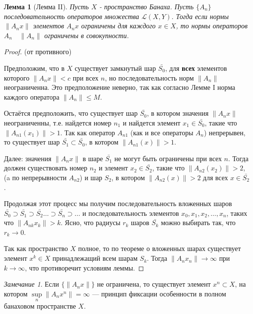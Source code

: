 \documentclass[12pt,a4paper,titlepage]{book}
\theoremstyle{definition}
\theoremstyle{plain}
\theoremstyle{remark}
\newtheorem*{remark}{Замечание}
\theoremstyle{plain}
\newtheorem{lemma}{Лемма}
\begin{document}
\begin{lemma}[Лемма II]
Пусть $X$ - пространство Банаха. Пусть $\lbrace A_n\rbrace$ последовательность операторов множества $\mathcal{L}(X,Y)$. Тогда если нормы $\lVert A_n x\rVert$ элементов $A_n x$ ограничены для каждого $x \in X$, то нормы операторов $A_n \quad \lVert A_n\rVert$ ограничены в совокупности.
\end{lemma}

\begin{proof}
(от противного)

Предположим, что в $X$ существует замкнутый шар $\bar{S_0}$, для \textbf{всех} элементов которого $\lVert A_n x\rVert < c$ при всех $n$, но последовательность норм $\lVert A_n\rVert$ неограниченна. Это предположение неверно, так как согласно Лемме I норма каждого оператора $\lVert A_n\rVert \le M$.

Остаётся предположить, что существует шар $\bar{S_0}$, в котором значения $\lVert A_n x\rVert$ неограниченны, т.е. найдется номер $n_1$ и найдется элемент $x_1 \in \bar{S_0}$, такие что $\lVert A_{n1} (x_1)\rVert > 1$. Так как оператор $A_{n1}$ (как и все операторы $A_n$) непрерывен, то существует шар $\bar{S_1} \subset \bar{S_0}$, в котором $\lVert A_{n1} (x)\rVert > 1$.

Далее: значения $\lVert A_n x\rVert$ в шаре $\bar{S_1}$ не могут быть ограничены при всех $n$. Тогда должен существовать номер $n_2$ и элемент $x_2 \in \bar{S_2}$, такие что $\lVert A_{n2} (x_2)\rVert > 2$, (a по непрерывности $A_{n2}$) и шар $S_2$, в котором $\lVert A_{n2} (x)\rVert > 2$ для всех $x \in \bar{S_2}$.

Продолжая этот процесс мы получим последовательность вложенных шаров $\bar{S_0} \supset \bar{S_1} \supset \bar{S_2} \ldots \supset \bar{S_n} \supset \ldots$ и последовательность элементов $x_0, x_1, x_2, \ldots, x_n$, таких что $\lVert A_{nk} x_k\rVert > k$. Ясно, что радиусы $r_k$ шаров $\bar{S_k}$ можно выбирать так, что $r_k \to 0$.

Так как пространство $X$ полное, то по теореме о вложенных шарах существует элемент $x^k \in X$ принадлежащий всем шарам $S_k$. Тогда $\lVert A_n x_n\rVert \to \infty$ при $k \to \infty$, что противоречит условиям леммы.
\end{proof}

\begin{remark}
Если $\lbrace \lVert A_n x\rVert \rbrace$ не ограничена, то существует элемент $x^n \subset X$, на котором $\sup\limits_{n}\lVert A_n x^n\rVert = \infty$ --- принцип фиксации особенности в полном банаховом пространстве $X$.
\end{remark}
\end{document}
